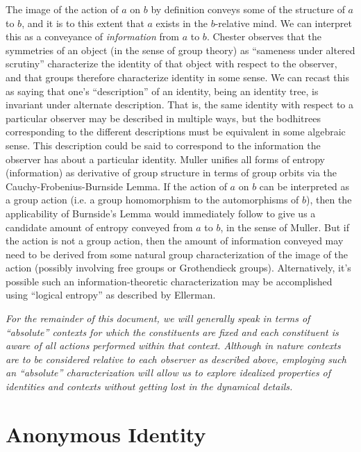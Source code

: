 \documentclass[pra,twocolumn,groupedaddress,10pt]{revtex4}
\theoremstyle{definition}
\begin{document}
The image of the action of $a$ on $b$ by definition conveys some of the structure of $a$ to $b$, and it is to this extent that $a$ exists in the $b$-relative mind. We can interpret this as a conveyance of \textit{information} from $a$ to $b$. Chester\cite{chester} observes that the symmetries of an object (in the sense of group theory) as ``sameness under altered scrutiny'' characterize the identity of that object with respect to the observer, and that groups therefore characterize identity in some sense. We can recast this as saying that one's ``description'' of an identity, being an identity tree, is invariant under alternate description. That is, the same identity with respect to a particular observer may be described in multiple ways, but the bodhitrees corresponding to the different descriptions must be equivalent in some algebraic sense. This description could be said to correspond to the information the observer has about a particular identity. Muller\cite{muller} unifies all forms of entropy (information) as derivative of group structure in terms of group orbits via the Cauchy-Frobenius-Burnside Lemma. If the action of $a$ on $b$ can be interpreted as a group action (i.e. a group homomorphism to the automorphisms of $b$), then the applicability of Burnside's Lemma would immediately follow to give us a candidate amount of entropy conveyed from $a$ to $b$, in the sense of Muller. But if the action is not a group action, then the amount of information conveyed may need to be derived from some natural group characterization of the image of the action (possibly involving free groups or Grothendieck groups\cite{grogroup}). Alternatively, it's possible such an information-theoretic characterization may be accomplished using ``logical entropy'' as described by Ellerman\cite{ellerman}.

\textit{For the remainder of this document, we will generally speak in terms of ``absolute'' contexts for which the constituents are fixed and each constituent is aware of all actions performed within that context. Although in nature contexts are to be considered relative to each observer as described above, employing such an ``absolute'' characterization will allow us to explore idealized properties of identities and contexts without getting lost in the dynamical details.}

\section{Anonymous Identity} \label{sec:anoide}
\end{document}
